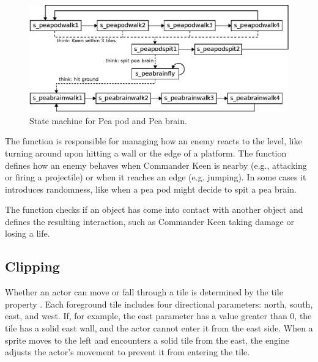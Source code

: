 \documentclass[book.tex]{subfiles}
\begin{document}
\begin{figure}[H]
  \centering
  \includegraphics[width=\textwidth]{imgs/drawings/state_machine.eps}
  \caption{State machine for Pea pod and Pea brain.}
  \label{fig:state_machine}  
\end{figure}

\par
The  function is responsible for managing how an enemy reacts to the level, like turning around upon hitting a wall or the edge of a platform. The  function defines how an enemy behaves when Commander Keen is nearby (e.g., attacking or firing a projectile) or when it reaches an edge (e.g. jumping). In some cases it introduces randomness, like when a pea pod might decide to spit a pea brain.\\

\par
\begin{minipage}{\textwidth}
  
\end{minipage}
\label{state_type}

\par
The  function checks if an object has come into contact with another object and defines the resulting interaction, such as Commander Keen taking damage or losing a life.



\subsection{Clipping}
\label{section:clipping}
Whether an actor can move or fall through a tile is determined by the tile property . Each foreground tile includes four directional parameters: north, south, east, and west. If, for example, the east parameter has a value greater than 0, the tile has a solid east wall, and the actor cannot enter it from the east side. When a sprite moves to the left and encounters a solid tile from the east, the engine adjusts the actor's movement to prevent it from entering the tile.\\
\end{document}
